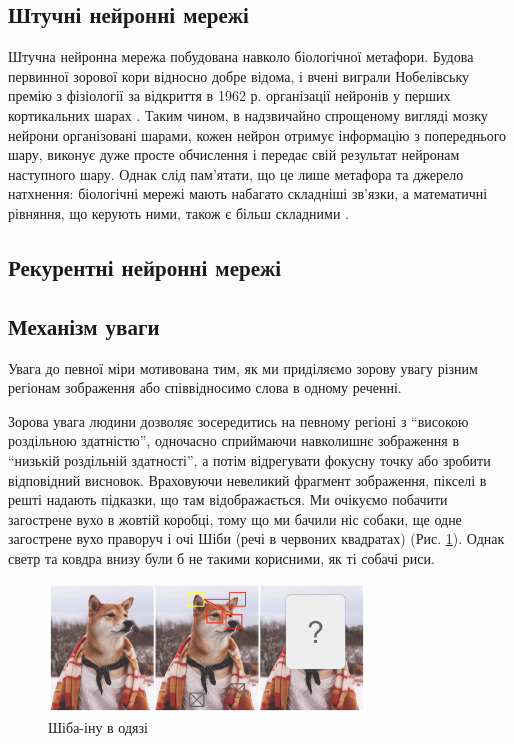 \documentclass[a4paper,14pt]{extreport}
\begin{document}
\subsection{Штучні нейронні мережі}
Штучна нейронна мережа побудована навколо біологічної метафори.
Будова первинної зорової кори відносно добре відома,
і вчені виграли Нобелівську премію з фізіології за відкриття в
1962 р. організації нейронів у перших кортикальних
шарах \cite{cortex-stuff}. Таким чином, в надзвичайно
спрощеному вигляді
мозку нейрони організовані шарами, кожен нейрон отримує
інформацію з попереднього шару, виконує дуже просте
обчислення і передає свій результат нейронам наступного
шару. Однак слід пам’ятати, що це лише метафора та джерело
натхнення: біологічні мережі мають набагато складніші
зв’язки, а математичні рівняння, що керують ними, також
є більш складними \cite{cortex-equations}.



\subsection{Рекурентні нейронні мережі}

\subsection{Механізм уваги}
Увага до певної міри мотивована тим, як ми приділяємо зорову увагу
різним регіонам зображення або співвідносимо слова в одному реченні.

Зорова увага людини дозволяє зосередитись на певному регіоні з
``високою роздільною здатністю'', одночасно сприймаючи навколишнє
зображення в ``низькій роздільній здатності'', а потім відрегувати
фокусну точку або зробити відповідний висновок.
Враховуючи невеликий фрагмент зображення, пікселі в решті надають підказки, що
там відображається. Ми очікуємо побачити загострене вухо в жовтій коробці,
тому що ми бачили ніс собаки, ще одне загострене вухо праворуч і очі
Шіби (речі в червоних квадратах) (Рис. \ref{fig:shiba}). Однак светр та ковдра внизу були
б не такими корисними, як ті собачі риси.

\begin{figure}[H]
    \centering
    \includegraphics[width=0.75\textwidth]{shiba-example-attention.png}
    \caption{Шіба-іну в одязі}
    \label{fig:shiba}
\end{figure}
\end{document}
